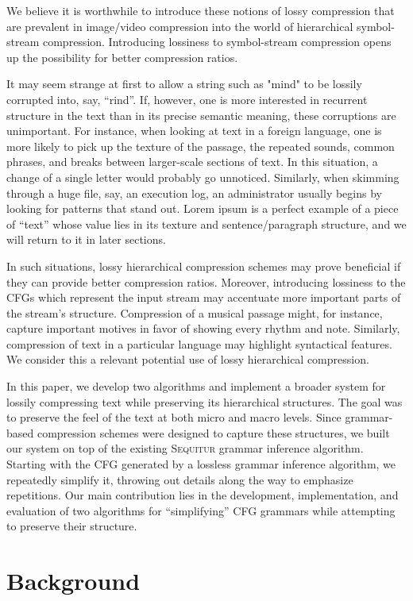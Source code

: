 \documentclass[11pt]{article}
\newcommand{\Sequitur}{\textsc{Sequitur}\xspace}
\begin{document}
We believe it is worthwhile to introduce these notions of lossy compression
that are prevalent in image/video compression into the world of hierarchical
symbol-stream compression. Introducing lossiness to symbol-stream compression
opens up the possibility for better compression ratios.

It may seem strange at first to allow a string such as "mind" to be lossily
corrupted into, say, ``rind''.  If, however, one is more interested in
recurrent structure in the text than in its precise semantic meaning, these
corruptions are unimportant.  For instance, when looking at text in a foreign
language, one is more likely to pick up the texture of the passage, the
repeated sounds, common phrases, and breaks between larger-scale sections of
text.  In this situation, a change of a single letter would probably go
unnoticed.  Similarly, when skimming through a huge file, say, an execution
log, an administrator usually begins by looking for patterns that stand out.
Lorem ipsum is a perfect example of a piece of ``text'' whose value lies in its
texture and sentence/paragraph structure, and we will return to it in later
sections.

In such situations, lossy hierarchical compression schemes may prove beneficial
if they can provide better compression ratios.  Moreover, introducing lossiness
to the CFGs which represent the input stream may accentuate more important
parts of the stream's structure.  Compression of a musical passage might, for
instance, capture important motives in favor of showing every rhythm and note.
Similarly, compression of text in a particular language may highlight
syntactical features.  We consider this a relevant potential use of lossy
hierarchical compression.

In this paper, we develop two algorithms and implement a broader system for
lossily compressing text while preserving its hierarchical structures.  The
goal was to preserve the feel of the text at both micro and macro levels.
Since grammar-based compression schemes were designed to capture these
structures, we built our system on top of the existing \Sequitur grammar
inference algorithm.  Starting with the CFG generated by a lossless grammar
inference algorithm, we repeatedly simplify it, throwing out details along the
way to emphasize repetitions.  Our main contribution lies in the development,
implementation, and evaluation of two algorithms for ``simplifying'' CFG
grammars while attempting to preserve their structure.

\section{Background}
\end{document}
